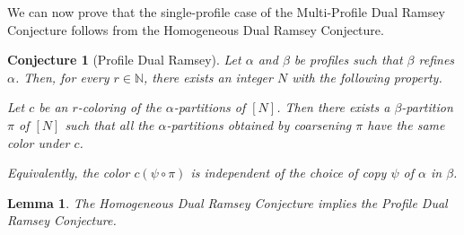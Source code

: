 \documentclass[11pt]{article}
\newtheorem{conjecture}[theorem]{Conjecture}
\newtheorem{lemma}[theorem]{Lemma}
\theoremstyle{remark}
\begin{document}
We can now prove that the single-profile case of the Multi-Profile Dual Ramsey Conjecture follows from the Homogeneous Dual Ramsey Conjecture.

\begin{conjecture}[Profile Dual Ramsey] \label{conj:pdr}
Let $\alpha$ and $\beta$ be profiles such that $\beta$ refines $\alpha$.
Then, for every $r\in\mathbb{N}$, there exists an integer $N$ with the following property.

Let $c$ be an $r$-coloring of the $\alpha$-partitions of $[N]$.
Then there exists a $\beta$-partition $\pi$ of $[N]$ such that all the $\alpha$-partitions obtained by coarsening $\pi$ have the same color under $c$.

Equivalently, the color $c(\psi\circ\pi)$ is independent of the choice of copy $\psi$ of $\alpha$ in $\beta$.
\end{conjecture}

\begin{lemma}\label{lem:hdr-implies-pdr}
    The Homogeneous Dual Ramsey Conjecture implies the Profile Dual Ramsey Conjecture.
\end{lemma}
\end{document}
